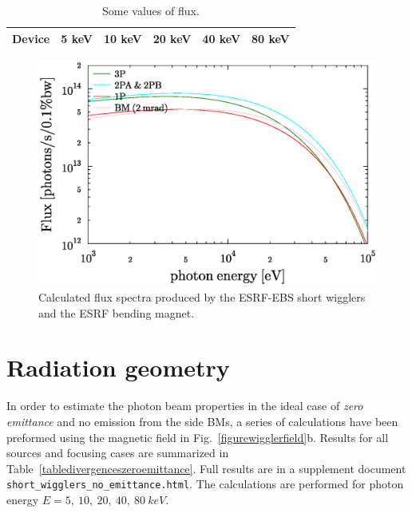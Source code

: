 \documentclass[a4paper,10pt]{article}
\begin{document}
\begin{table}[H]
\label{tableflux}
\caption{Some values of flux.}
\vspace{0.3cm}
\begin{tabular}{cccccc}      %
\hline
Device    & 5 keV  & 10 keV  &  20 keV  & 40 keV   & 80 keV  \\
\hline

\hline
\end{tabular}
\end{table}



\begin{figure}[H]
\label{figurespectra}
\centering
\includegraphics[keepaspectratio,width=5in]{GRAPHICS/spectrum.eps}
\caption{Calculated flux spectra produced by the ESRF-EBS short wigglers and the ESRF bending magnet.}
\end{figure}




\section{Radiation geometry}

In order to estimate the photon beam properties in the ideal case of {\it zero emittance} and no emission from the side BMs, 
a series of calculations have been preformed using the magnetic field in Fig.~\ref{figurewigglerfield}b. 
Results for all sources and focusing cases are summarized in Table~\ref{tabledivergenceszeroemittance}. 
Full results are in a supplement document {\tt short\_wigglers\_no\_emittance.html}. 
The calculations are performed for photon energy $E=5,~10,~20,~40,~80~keV$. 
\end{document}
